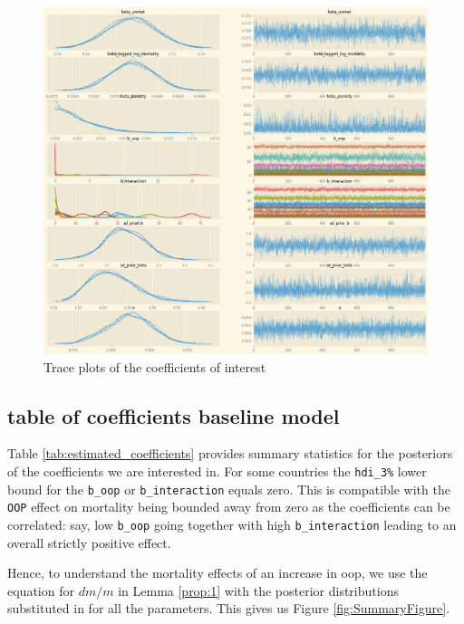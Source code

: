 \documentclass[a4paper,12pt]{article}
\begin{document}
\begin{figure}[htbp]
\centering
\includegraphics[width=.9\linewidth]{./figures/trace_plot_baseline.png}
\caption{\label{fig:Trace}Trace plots of the coefficients of interest}
\end{figure}


\subsection{table of coefficients baseline model}
\label{sec:orgefa68e6}

Table \ref{tab:estimated_coefficients} provides summary statistics for the posteriors of the coefficients we are interested in. For some countries the \texttt{hdi\_3\%} lower bound for the \texttt{b\_oop} or \texttt{b\_interaction} equals zero. This is compatible with the \texttt{OOP} effect on mortality being bounded away from zero as the coefficients can be correlated: say, low \texttt{b\_oop} going together with high \texttt{b\_interaction} leading to an overall strictly positive effect.

Hence, to understand the mortality effects of an increase in oop, we use the equation for \(dm/m\) in Lemma \ref{prop:1} with the posterior distributions substituted in for all the parameters. This gives us Figure \ref{fig:SummaryFigure}.
\end{document}
